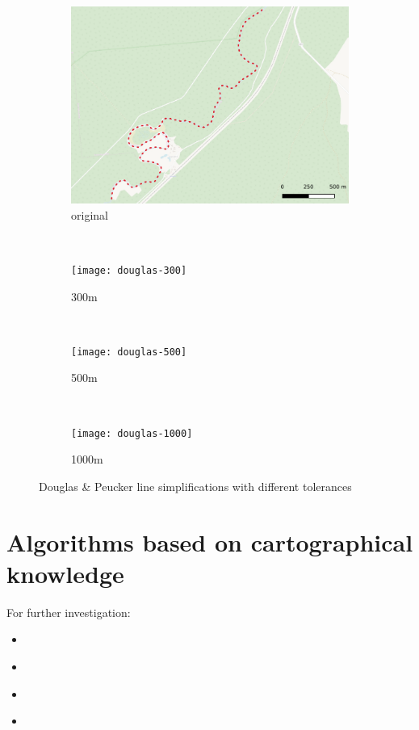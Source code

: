 \documentclass{article}
\begin{document}
\begin{figure}
    \centering
    \begin{subfigure}[b]{0.23\textwidth}
        \includegraphics[width=\textwidth]{zeimena}
        \caption{original}
        \label{fig:zeimena-original}
    \end{subfigure}
    ~
    \begin{subfigure}[b]{0.23\textwidth}
        \texttt{[image: douglas-300]}
        \caption{300m}
        \label{fig:douglas-300}
    \end{subfigure}
    ~
    \begin{subfigure}[b]{0.23\textwidth}
        \texttt{[image: douglas-500]}
        \caption{500m}
        \label{fig:douglas-500}
    \end{subfigure}
    ~
    \begin{subfigure}[b]{0.23\textwidth}
        \texttt{[image: douglas-1000]}
        \caption{1000m}
        \label{fig:douglas-1000}
    \end{subfigure}
    \caption{Douglas \& Peucker line simplifications with different tolerances}
    \label{fig:douglas-peucker}
\end{figure}

\section{Algorithms based on cartographical knowledge}

For further investigation:
\begin{itemize}
    \item \cite{jiang2003line}
    \item \cite{dyken2009simultaneous}
    \item \cite{mustafa2006dynamic}
    \item \cite{nollenburg2008morphing}
\end{itemize}
\end{document}
